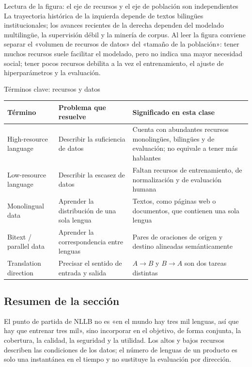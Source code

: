 
\begin{knowledgebox}{Lectura de la figura: el eje de recursos y el eje de población son independientes}
La trayectoria histórica de la izquierda depende de textos bilingües institucionales; los avances recientes de la derecha dependen del modelado multilingüe, la supervisión débil y la minería de corpus. Al leer la figura conviene separar el «volumen de recursos de datos» del «tamaño de la población»: tener muchos recursos suele facilitar el modelado, pero no indica una mayor necesidad social; tener pocos recursos debilita a la vez el entrenamiento, el ajuste de hiperparámetros y la evaluación.
\end{knowledgebox}

\begin{knowledgebox}{Términos clave: recursos y datos}
\begin{tabularx}{\textwidth}{@{}L{0.21\textwidth}L{0.28\textwidth}X@{}}
\toprule
Término & Problema que resuelve & Significado en esta clase \\
\midrule
High-resource language & Describir la suficiencia de datos & Cuenta con abundantes recursos monolingües, bilingües y de evaluación; no equivale a tener más hablantes \\
Low-resource language & Describir la escasez de datos & Faltan recursos de entrenamiento, de normalización y de evaluación humana \\
Monolingual data & Aprender la distribución de una sola lengua & Textos, como páginas web o documentos, que contienen una sola lengua \\
Bitext / parallel data & Aprender la correspondencia entre lenguas & Pares de oraciones de origen y destino alineadas semánticamente \\
Translation direction & Precisar el sentido de entrada y salida & $A\rightarrow B$ y $B\rightarrow A$ son dos tareas distintas \\
\bottomrule
\end{tabularx}
\end{knowledgebox}

\subsection{Resumen de la sección}

El punto de partida de NLLB no es «en el mundo hay tres mil lenguas, así que hay que entrenar tres mil», sino incorporar en el objetivo, de forma conjunta, la cobertura, la calidad, la seguridad y la utilidad. Los altos y bajos recursos describen las condiciones de los datos; el número de lenguas de un producto es solo una instantánea en el tiempo y no sustituye la evaluación por dirección.
